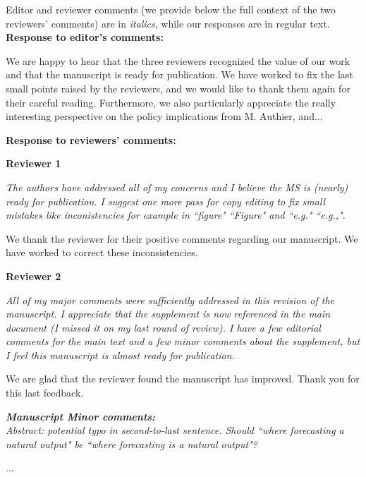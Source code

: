 \documentclass[11pt,letter]{article}
\begin{document}
\setlength{\parindent}{0cm}
\setlength{\parskip}{7pt}

Editor and reviewer comments (we provide below the full context of the two reviewers' comments) are in \emph{italics}, while our responses are in regular text. \\ 

{\bf Response to editor's comments:} 

We are happy to hear that the three reviewers recognized the value of our work and that the manuscript is ready for publication. We have worked to fix the last small points raised by the reviewers, and we would like to thank them again for their careful reading. Furthermore, we also particularly appreciate the really interesting perspective on the policy implications from M. Authier, and...

{\bf Response to reviewers' comments:} 

{\bf Reviewer 1}

\begin{mybox}
\emph{The authors have addressed all of my concerns and I believe the MS is
(nearly) ready for publication. I suggest one more pass for copy editing
to fix small mistakes like inconistencies for example in ``figure"
``Figure" and ``e.g." ``e.g.,".}
\end{mybox}

We thank the reviewer for their positive comments regarding our manuscript. 
We have worked to correct these inconsistencies.

{\bf Reviewer 2}

\begin{mybox}
\emph{All of my major comments were sufficiently addressed in this revision of
the manuscript. I appreciate that the supplement is now referenced in
the main document (I missed it on my last round of review). I have a few
editorial comments for the main text and a few minor comments about the
supplement, but I feel this manuscript is almost ready for publication.}
\end{mybox}

We are glad that the reviewer found the manuscript has improved.
Thank you for this last feedback. 

\begin{mybox}
\emph{\textbf{Manuscript Minor comments:}\\
Abstract: potential typo in second-to-last sentence. Should ``where
forecasting a natural output" be ``where forecasting is a natural output"?}
\end{mybox}
...
\end{document}
